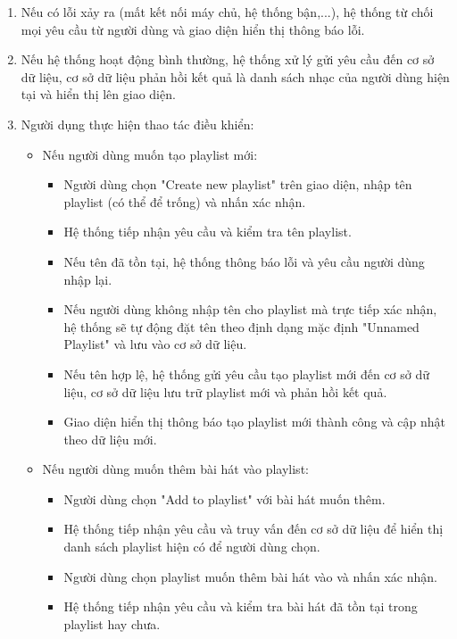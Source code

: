 \documentclass[a4paper]{article}
\begin{document}
\begin{itemize}
\begin{enumerate}
          \item Nếu có lỗi xảy ra (mất kết nối máy chủ, hệ thống bận,...), hệ thống từ chối mọi yêu cầu từ người dùng và giao diện hiển thị thông báo lỗi.
		      \item Nếu hệ thống hoạt động bình thường, hệ thống xử lý gửi yêu cầu đến cơ sở dữ liệu, cơ sở dữ liệu phản hồi kết quả là danh sách nhạc của người dùng hiện tại và hiển thị lên giao diện.
		      \item Người dụng thực hiện thao tác điều khiển:
		            \begin{itemize}
			            \item Nếu người dùng muốn tạo playlist mới:
			                  \begin{itemize}
				                  \item Người dùng chọn "Create new playlist" trên giao diện, nhập tên playlist (có thể để trống) và nhấn xác nhận.
				                  \item Hệ thống tiếp nhận yêu cầu và kiểm tra tên playlist.
				                  \item Nếu tên đã tồn tại, hệ thống thông báo lỗi và yêu cầu người dùng nhập lại.
				                  \item Nếu người dùng không nhập tên cho playlist mà trực tiếp xác nhận, hệ thống sẽ tự động đặt tên theo định dạng mặc định "Unnamed Playlist" và lưu vào cơ sở dữ liệu.
				                  \item Nếu tên hợp lệ, hệ thống gửi yêu cầu tạo playlist mới đến cơ sở dữ liệu, cơ sở dữ liệu lưu trữ playlist mới và phản hồi kết quả.
				                  \item Giao diện hiển thị thông báo tạo playlist mới thành công và cập nhật theo dữ liệu mới.
			                  \end{itemize}
			            \item Nếu người dùng muốn thêm bài hát vào playlist:
			                  \begin{itemize}
				                  \item Người dùng chọn "Add to playlist" với bài hát muốn thêm.
				                  \item Hệ thống tiếp nhận yêu cầu và truy vấn đến cơ sở dữ liệu để hiển thị danh sách playlist hiện có để người dùng chọn.
				                  \item Người dùng chọn playlist muốn thêm bài hát vào và nhấn xác nhận.
				                  \item Hệ thống tiếp nhận yêu cầu và kiểm tra bài hát đã tồn tại trong playlist hay chưa.

\end{itemize}
\end{itemize}
\end{enumerate}
\end{itemize}
\end{document}

